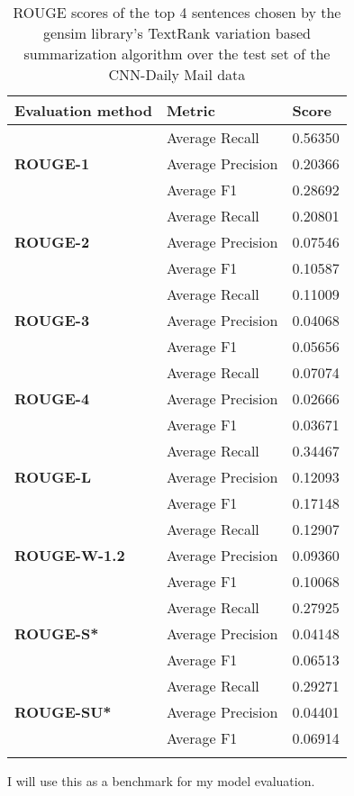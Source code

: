\begin{longtable}{| l | l | l |}
	\hline
	\textbf{Evaluation method}&\textbf{Metric}&\textbf{Score}\\ \hline \hline
	\multirow{3}{*}{\textbf{ROUGE-1}}
		&Average Recall&0.56350 \\
		&Average Precision&0.20366  \\
		&Average F1&0.28692  \\ \hline \hline
	\multirow{3}{*}{\textbf{ROUGE-2}}
		&Average Recall&0.20801 \\
		&Average Precision&0.07546 \\
		&Average F1&0.10587 \\ \hline \hline
	\multirow{3}{*}{\textbf{ROUGE-3}}
		&Average Recall&0.11009 \\
		&Average Precision&0.04068 \\
		&Average F1&0.05656 \\ \hline \hline
	\multirow{3}{*}{\textbf{ROUGE-4}}
		&Average Recall&0.07074 \\
		&Average Precision&0.02666 \\
		&Average F1&0.03671 \\ \hline \hline
	\multirow{3}{*}{\textbf{ROUGE-L}}
		&Average Recall&0.34467 \\
		&Average Precision&0.12093 \\
		&Average F1&0.17148 \\ \hline \hline
	\multirow{3}{*}{\textbf{ROUGE-W-1.2}}
		&Average Recall&0.12907 \\
		&Average Precision&0.09360 \\
		&Average F1&0.10068 \\ \hline \hline
	\multirow{3}{*}{\textbf{ROUGE-S*}}
		&Average Recall&0.27925 \\
		&Average Precision&0.04148 \\
		&Average F1&0.06513 \\ \hline \hline
	\multirow{3}{*}{\textbf{ROUGE-SU*}}
		&Average Recall&0.29271 \\
		&Average Precision&0.04401 \\
		&Average F1&0.06914 \\ \hline
	\caption{ROUGE scores of the top 4 sentences chosen by the gensim library's TextRank variation based summarization algorithm over the test set of the CNN-Daily Mail data}
\end{longtable}

I will use this as a benchmark for my model evaluation.

